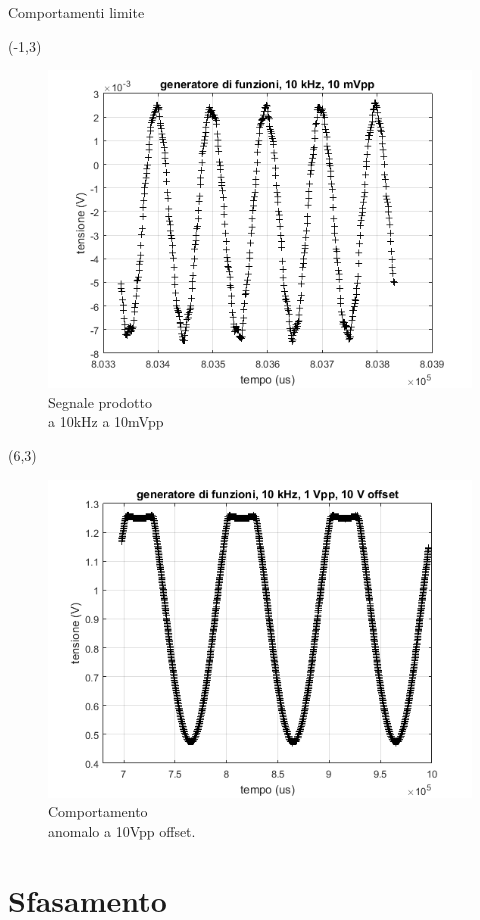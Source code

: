 \documentclass{beamer}
\begin{document}
\begin{frame}{Comportamenti limite}
\begin{textblock}{12}(-1,3)
\begin{figure}
\centering
\includegraphics[width=0.6\linewidth]{./prova_gen_10khz_10mpp}
\caption{Segnale prodotto \\
a 10kHz a 10mVpp}
\label{fig:prova_gen_10khz_10mpp}
\end{figure}
\end{textblock}

\begin{textblock}{12}(6,3)
\begin{figure}
\centering
\includegraphics[width=0.6\linewidth]{./sballato}
\caption{Comportamento \\
anomalo a 10Vpp offset.}
\label{fig:sballato}
\end{figure}
\end{textblock}

\end{frame}




\section{Sfasamento}
\end{document}
